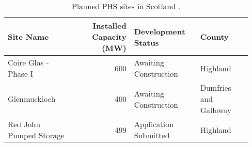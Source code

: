 \begin{table}[htbp]
	\caption{Planned PHS sites in Scotland \citep{BEIS2018PlanningDatabase}.}
	\label{tbl:planned_phs}
	\centering
	\begin{tabular}{@{}lrll@{}}
		\toprule
		Site Name & Installed Capacity (MW) & Development Status & County \\ \midrule
		Coire Glas - Phase I & 600 & Awaiting Construction & Highland \\
		Glenmuckloch & 400 & Awaiting Construction & Dumfries and Galloway \\
		Red John Pumped Storage & 499 & Application Submitted & Highland \\ \bottomrule
	\end{tabular}
\end{table}